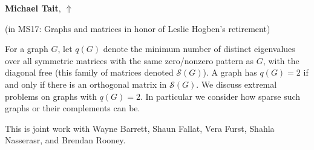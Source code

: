 \documentclass[ILAS2025-program.tex]{subfiles}
\begin{document}
\hypertarget{down0178}{}\begin{ilasabstract}
    
\textbf{Michael Tait},  \hfill \hyperlink{up0178}{$\Uparrow$}
    
    
(in {\color{mstitle}MS17: Graphs and matrices in honor of Leslie Hogben's retirement})
        
\mtskip
    For a graph $G$, let $q(G)$ denote the minimum number of distinct eigenvalues over all symmetric matrices with the same zero/nonzero pattern as $G$, with the diagonal free (this family of matrices denoted $\mathcal{S}(G)$). A graph has $q(G) = 2$ if and only if there is an orthogonal matrix in $\mathcal{S}(G)$. We discuss extremal problems on graphs with $q(G)=2$. In particular we consider how sparse such graphs or their complements can be.

This is joint work with Wayne Barrett, Shaun Fallat, Vera Furst, Shahla Nasserasr, and Brendan Rooney.


\end{ilasabstract}
    
\end{document}
